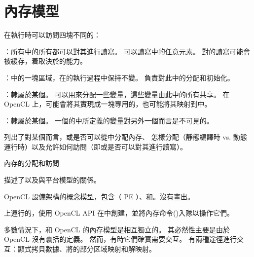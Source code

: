 
\section{內存模型}
在執行時可以訪問四塊不同的：

\startigBase
\item {\ftEmp {}：}所有中的所有都可以對其進行讀寫。
可以讀寫中的任意元素。
對的讀寫可能會被緩存，着取決於的能力。

\item {\ftEmp {}：}中的一塊區域，在的執行過程中保持不變。
負責對此中的分配和初始化。

\item {\ftEmp {}：}隸屬於某個。
可以用來分配一些變量，這些變量由此中的所有共享。
在 OpenCL 上，可能會將其實現成一塊專用的，也可能將其映射到中。

\item {\ftEmp {}：}隸屬於某個。
一個的中所定義的變量對另外一個而言是不可見的。
\stopigBase

列出了對某個而言，或是否可以從中分配內存、
怎樣分配（靜態編譯時 vs. 動態運行時）以及允許如何訪問（即或是否可以對其進行讀寫）。

\startbuffer[buftblcapmemregion]
內存的分配和訪問
\stopbuffer
{}

描述了以及與平台模型的關係。

\startbuffer[buffigcapopenclarch]
OpenCL 設備架構的概念模型，包含（ PE ）、和。沒有畫出。
\stopbuffer

{}

上運行的，使用 OpenCL API 在中創建，並將內存命令()入隊以操作它們。

多數情況下，和 OpenCL 的內存模型是相互獨立的。
其必然性主要是由於 OpenCL 沒有囊括的定義。
然而，有時它們確實需要交互。
有兩種途徑進行交互：顯式拷貝數據、將的部分区域映射和解映射。

